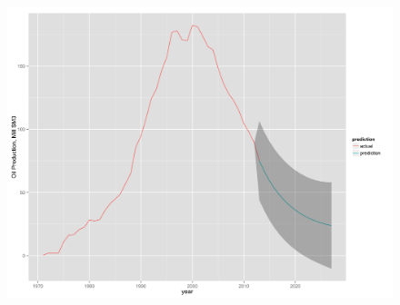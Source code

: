\documentclass{beamer}
\begin{document}
\begin{frame}[plain]
	\begin{figure}
	\includegraphics[width=1\textwidth]{tot_forecast.png}
	\end{figure}
\end{frame}
\end{document}

